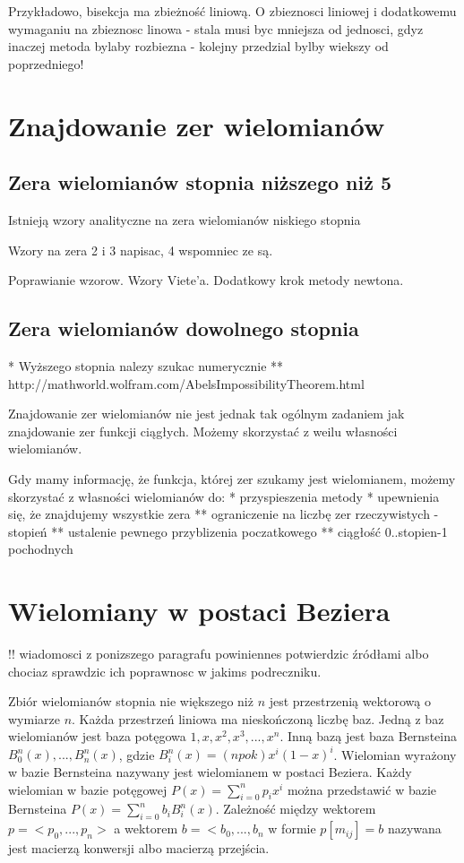 \documentclass[11pt,a4paper,oneside]{report}
\begin{document}
Przykładowo, bisekcja ma zbieżność liniową. O zbieznosci liniowej i dodatkowemu wymaganiu na zbieznosc linowa - stala musi byc mniejsza od jednosci, gdyz inaczej metoda bylaby rozbiezna - kolejny przedzial bylby wiekszy od poprzedniego!

\section{Znajdowanie zer wielomianów}

\subsection{Zera wielomianów stopnia niższego niż 5}

Istnieją wzory analityczne na zera wielomianów niskiego stopnia

Wzory na zera 2 i 3 napisac, 4 wspomniec ze są.

Poprawianie wzorow. Wzory Viete'a. Dodatkowy krok metody newtona.

\subsection{Zera wielomianów dowolnego stopnia}

* Wyższego stopnia nalezy szukac numerycznie
** http://mathworld.wolfram.com/AbelsImpossibilityTheorem.html

Znajdowanie zer wielomianów nie jest jednak tak ogólnym zadaniem jak znajdowanie zer funkcji ciągłych. Możemy skorzystać z weilu własności wielomianów.

Gdy mamy informację, że funkcja, której zer szukamy jest wielomianem, możemy skorzystać z własności wielomianów do:
* przyspieszenia metody
* upewnienia się, że znajdujemy wszystkie zera
** ograniczenie na liczbę zer rzeczywistych - stopień
** ustalenie pewnego przyblizenia poczatkowego
** ciągłość 0..stopien-1 pochodnych



\section{Wielomiany w postaci Beziera}

!! wiadomosci z ponizszego paragrafu powiniennes potwierdzic źródłami albo chociaz sprawdzic ich poprawnosc w jakims podreczniku.

Zbiór wielomianów stopnia nie większego niż $n$ jest przestrzenią wektorową o wymiarze $n$. Każda przestrzeń liniowa ma nieskończoną liczbę baz. Jedną z baz wielomianów jest baza potęgowa ${1,x,x^2,x^3,...,x^n}$. Inną bazą jest baza Bernsteina ${B^n_0(x),...,B^n_n(x)}$, gdzie $B^n_i(x) = (n po k)x^i(1-x)^i$. Wielomian wyrażony w bazie Bernsteina nazywany jest wielomianem w postaci Beziera. Każdy wielomian w bazie potęgowej $P(x) = \sum^n_{i=0}p_i x^i$ można przedstawić w bazie Bernsteina $P(x) = \sum^n_{i=0}b_i B^n_i(x)$. Zależność między wektorem $p = <p_0,...,p_n>$ a wektorem $b = <b_0, ..., b_n$ w formie $p [ m_{ij} ] = b$ nazywana jest macierzą konwersji albo macierzą przejścia.
\end{document}
